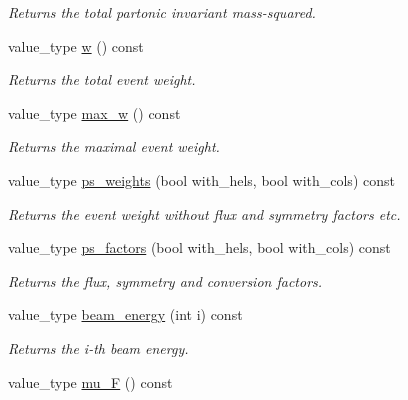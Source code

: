 \begin{DoxyCompactItemize}
\begin{DoxyCompactList}\small\item\em Returns the total partonic invariant mass-\/squared. \end{DoxyCompactList}\item 
\hypertarget{a00430_ad8f5784273d95bcea8ef4e61cff3bc3e}{value\-\_\-type \hyperlink{a00430_ad8f5784273d95bcea8ef4e61cff3bc3e}{w} () const }\label{a00430_ad8f5784273d95bcea8ef4e61cff3bc3e}

\begin{DoxyCompactList}\small\item\em Returns the total event weight. \end{DoxyCompactList}\item 
\hypertarget{a00430_a7e6ff5ed5c6e4b0774bfd5067cc5a54e}{value\-\_\-type \hyperlink{a00430_a7e6ff5ed5c6e4b0774bfd5067cc5a54e}{max\-\_\-w} () const }\label{a00430_a7e6ff5ed5c6e4b0774bfd5067cc5a54e}

\begin{DoxyCompactList}\small\item\em Returns the maximal event weight. \end{DoxyCompactList}\item 
value\-\_\-type \hyperlink{a00430_ad5df91b2c5e630adc9e59b499ded970f}{ps\-\_\-weights} (bool with\-\_\-hels, bool with\-\_\-cols) const 
\begin{DoxyCompactList}\small\item\em Returns the event weight without flux and symmetry factors etc. \end{DoxyCompactList}\item 
value\-\_\-type \hyperlink{a00430_ad13dc7c85318802813697cdeeeee0e57}{ps\-\_\-factors} (bool with\-\_\-hels, bool with\-\_\-cols) const 
\begin{DoxyCompactList}\small\item\em Returns the flux, symmetry and conversion factors. \end{DoxyCompactList}\item 
\hypertarget{a00430_acea9c82d86081354dfa1db7bbf2a86da}{value\-\_\-type \hyperlink{a00430_acea9c82d86081354dfa1db7bbf2a86da}{beam\-\_\-energy} (int i) const }\label{a00430_acea9c82d86081354dfa1db7bbf2a86da}

\begin{DoxyCompactList}\small\item\em Returns the i-\/th beam energy. \end{DoxyCompactList}\item 
\hypertarget{a00430_aa9339b30978ba9c659986995f50246b9}{value\-\_\-type \hyperlink{a00430_aa9339b30978ba9c659986995f50246b9}{mu\-\_\-\-F} () const }\label{a00430_aa9339b30978ba9c659986995f50246b9}


\end{DoxyCompactItemize}
